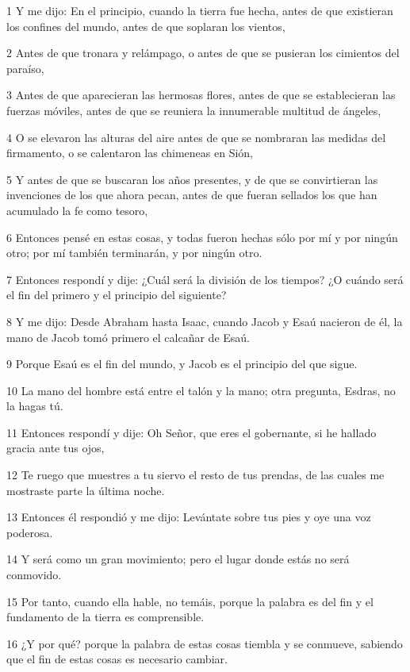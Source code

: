 \par 1 Y me dijo: En el principio, cuando la tierra fue hecha, antes de que existieran los confines del mundo, antes de que soplaran los vientos,
\par 2 Antes de que tronara y relámpago, o antes de que se pusieran los cimientos del paraíso,
\par 3 Antes de que aparecieran las hermosas flores, antes de que se establecieran las fuerzas móviles, antes de que se reuniera la innumerable multitud de ángeles,
\par 4 O se elevaron las alturas del aire antes de que se nombraran las medidas del firmamento, o se calentaron las chimeneas en Sión,
\par 5 Y antes de que se buscaran los años presentes, y de que se convirtieran las invenciones de los que ahora pecan, antes de que fueran sellados los que han acumulado la fe como tesoro,
\par 6 Entonces pensé en estas cosas, y todas fueron hechas sólo por mí y por ningún otro; por mí también terminarán, y por ningún otro.
\par 7 Entonces respondí y dije: ¿Cuál será la división de los tiempos? ¿O cuándo será el fin del primero y el principio del siguiente?
\par 8 Y me dijo: Desde Abraham hasta Isaac, cuando Jacob y Esaú nacieron de él, la mano de Jacob tomó primero el calcañar de Esaú.
\par 9 Porque Esaú es el fin del mundo, y Jacob es el principio del que sigue.
\par 10 La mano del hombre está entre el talón y la mano; otra pregunta, Esdras, no la hagas tú.
\par 11 Entonces respondí y dije: Oh Señor, que eres el gobernante, si he hallado gracia ante tus ojos,
\par 12 Te ruego que muestres a tu siervo el resto de tus prendas, de las cuales me mostraste parte la última noche.
\par 13 Entonces él respondió y me dijo: Levántate sobre tus pies y oye una voz poderosa.
\par 14 Y será como un gran movimiento; pero el lugar donde estás no será conmovido.
\par 15 Por tanto, cuando ella hable, no temáis, porque la palabra es del fin y el fundamento de la tierra es comprensible.
\par 16 ¿Y por qué? porque la palabra de estas cosas tiembla y se conmueve, sabiendo que el fin de estas cosas es necesario cambiar.
